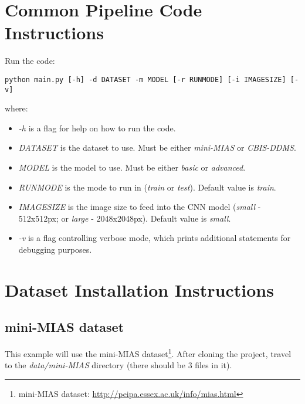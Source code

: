 
\section{Common Pipeline Code Instructions}
\label{sec:appendix-common-pipeline-instructions}

Run the code:

\begin{lstlisting}
python main.py [-h] -d DATASET -m MODEL [-r RUNMODE] [-i IMAGESIZE] [-v]
\end{lstlisting}

where:
\begin{itemize}
    \item \textit{-h} is a  flag for help on how to run the code.
    \item \textit{DATASET} is the dataset to use. Must be either \textit{mini-MIAS} or \textit{CBIS-DDMS}.
    \item \textit{MODEL} is the model to use. Must be either \textit{basic} or \textit{advanced}.
    \item \textit{RUNMODE} is the mode to run in (\textit{train} or \textit{test}). Default value is \textit{train}.
    \item \textit{IMAGESIZE} is the image size to feed into the CNN model (\textit{small} - 512x512px; or \textit{large} - 2048x2048px). Default value is \textit{small}.
    \item \textit{-v} is a flag controlling verbose mode, which prints additional statements for debugging purposes.
\end{itemize}


\section{Dataset Installation Instructions}

\subsection{mini-MIAS dataset}

This example will use the mini-MIAS dataset\footnote{mini-MIAS dataset: \url{http://peipa.essex.ac.uk/info/mias.html}}. After cloning the project, travel to the \textit{data/mini-MIAS} directory (there should be 3 files in it).\\


